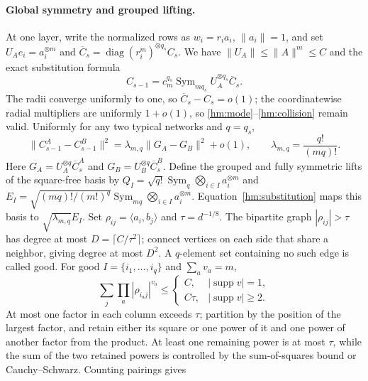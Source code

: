 \documentclass[a4paper]{tufte-handout}
\begin{document}
\begin{fullwidth}
\paragraph{Global symmetry and grouped lifting.}
At one layer, write the normalized rows as $w_i=r_i a_i$, $\|a_i\|=1$, and set
$U_Ae_i=a_i^{\otimes m}$ and $\overline C_s=\operatorname{diag}(r_i^m)^{\otimes q_s}C_s$.
We have $\|U_A\|\le\|A\|^m\le C$ and the exact substitution formula
\begin{equation}\label{hm:substitution}
 C_{s-1}=c_m^{q_s}\operatorname{Sym}_{mq_s}U_A^{\otimes q_s}\overline C_s.
\end{equation}
The radii converge uniformly to one, so $\overline C_s-C_s=o(1)$; the coordinatewise radial multipliers are uniformly $1+o(1)$, so \eqref{hm:mode}--\eqref{hm:collision} remain valid.
Uniformly for any two typical networks and $q=q_s$,
\begin{equation}\label{hm:sym-group}
 \|C_{s-1}^A-C_{s-1}^B\|^2
 =\lambda_{m,q}\|G_A-G_B\|^2+o(1),\qquad
 \lambda_{m,q}=\frac{q!}{(mq)!}.
\end{equation}
Here $G_A=U_A^{\otimes q}\overline C_s^A$ and $G_B=U_B^{\otimes q}\overline C_s^B$.
Define the grouped and fully symmetric lifts of the square-free basis by
$Q_I=\sqrt{q!}\operatorname{Sym}_q\bigotimes_{i\in I}a_i^{\otimes m}$ and
$E_I=\sqrt{(mq)!/(m!)^q}\operatorname{Sym}_{mq}\bigotimes_{i\in I}a_i^{\otimes m}$.
Equation~\eqref{hm:substitution} maps this basis to $\sqrt{\lambda_{m,q}}E_I$.
Set $\rho_{ij}=\langle a_i,b_j\rangle$ and $\tau=d^{-1/8}$.
The bipartite graph $|\rho_{ij}|>\tau$ has degree at most $D=\lceil C/\tau^2\rceil$;
connect vertices on each side that share a neighbor, giving degree at most $D^2$. A $q$-element set containing no such edge is called good.
For good $I=\{i_1,\ldots,i_q\}$ and $\sum_av_a=m$,
\begin{equation}\label{hm:mixed-column}
 \sum_j\prod_a|\rho_{i_aj}|^{v_a}\le
 \begin{cases}C,&|\operatorname{supp}v|=1,\\ C\tau,&|\operatorname{supp}v|\ge2.\end{cases}
\end{equation}
At most one factor in each column exceeds $\tau$; partition by the position of the largest factor,
and retain either its square or one power of it and one power of another factor from the product.
At least one remaining power is at most $\tau$, while the sum of the two retained powers is controlled by the sum-of-squares bound or Cauchy--Schwarz.
Counting pairings gives

\end{fullwidth}
\end{document}
